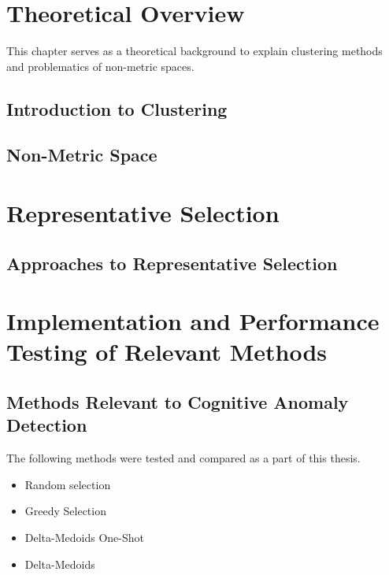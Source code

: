 \documentclass[thesis=B,english]{FITthesis}[2012/10/20]
\begin{document}
\chapter{Theoretical Overview}

This chapter serves as a theoretical background to explain clustering methods and problematics of non-metric spaces.

\section{Introduction to Clustering}

\section{Non-Metric Space}

\chapter{Representative Selection}

\section{Approaches to Representative Selection}


\chapter{Implementation and Performance Testing of Relevant Methods}

\section{Methods Relevant to Cognitive Anomaly Detection}
The following methods were tested and compared as a part of this thesis.
\begin{itemize}
    \item Random selection
    \item Greedy Selection
    \item Delta-Medoids One-Shot
    \item Delta-Medoids %
\end{itemize}
\end{document}
